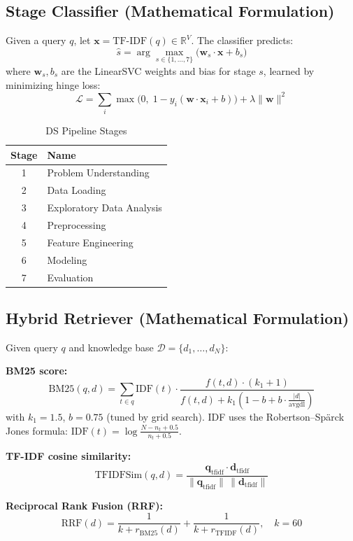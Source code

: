 \documentclass[12pt,a4paper]{article}
\begin{document}
\subsection{Stage Classifier (Mathematical Formulation)}

Given a query $q$, let $\mathbf{x} = \text{TF-IDF}(q) \in \mathbb{R}^V$. The classifier predicts:
\[
  \hat{s} = \arg\max_{s \in \{1,\ldots,7\}} \bigl(\mathbf{w}_s \cdot \mathbf{x} + b_s\bigr)
\]
where $\mathbf{w}_s, b_s$ are the LinearSVC weights and bias for stage $s$, learned by minimizing hinge loss:
\[
  \mathcal{L} = \sum_i \max\!\bigl(0,\; 1 - y_i(\mathbf{w}\cdot\mathbf{x}_i + b)\bigr) + \lambda\|\mathbf{w}\|^2
\]

\begin{table}[h!]
\centering
\caption{DS Pipeline Stages}
\begin{tabular}{cl}
\toprule
Stage & Name \\
\midrule
1 & Problem Understanding \\
2 & Data Loading \\
3 & Exploratory Data Analysis \\
4 & Preprocessing \\
5 & Feature Engineering \\
6 & Modeling \\
7 & Evaluation \\
\bottomrule
\end{tabular}
\end{table}

\subsection{Hybrid Retriever (Mathematical Formulation)}

Given query $q$ and knowledge base $\mathcal{D} = \{d_1,\ldots,d_N\}$:

\textbf{BM25 score:}
\[
  \text{BM25}(q,d) = \sum_{t \in q} \text{IDF}(t)\cdot\frac{f(t,d)\cdot(k_1+1)}{f(t,d)+k_1\!\left(1-b+b\cdot\tfrac{|d|}{\text{avgdl}}\right)}
\]
with $k_1=1.5$, $b=0.75$ (tuned by grid search). IDF uses the Robertson--Sp\"{a}rck Jones formula: $\text{IDF}(t)=\log\tfrac{N-n_t+0.5}{n_t+0.5}$.

\textbf{TF-IDF cosine similarity:}
\[
  \text{TFIDFSim}(q,d) = \frac{\mathbf{q}_{\text{tfidf}}\cdot\mathbf{d}_{\text{tfidf}}}{\|\mathbf{q}_{\text{tfidf}}\|\,\|\mathbf{d}_{\text{tfidf}}\|}
\]

\textbf{Reciprocal Rank Fusion (RRF):}
\[
  \text{RRF}(d) = \frac{1}{k+r_{\text{BM25}}(d)}+\frac{1}{k+r_{\text{TFIDF}}(d)}, \quad k=60
\]
\end{document}
